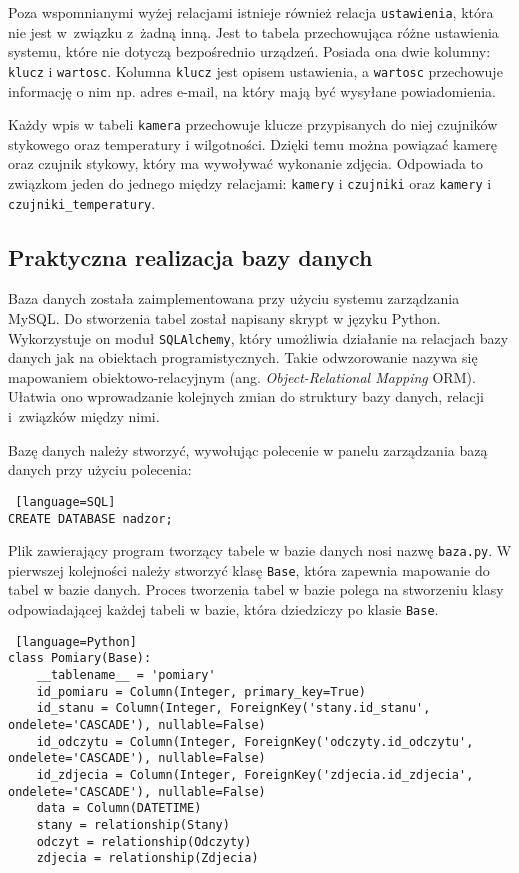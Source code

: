 \documentclass[a4paper,11pt,twoside]{article}
\begin{document}
Poza wspomnianymi wyżej relacjami istnieje również relacja \texttt{ustawienia}, która nie jest w~związku z~żadną inną. Jest to tabela przechowująca różne ustawienia systemu, które nie dotyczą bezpośrednio urządzeń. Posiada ona dwie kolumny: \texttt{klucz} i \texttt{wartosc}. Kolumna \texttt{klucz} jest opisem ustawienia, a \texttt{wartosc} przechowuje informację o nim np. adres e-mail, na który mają być wysyłane powiadomienia. 

Każdy wpis w tabeli \texttt{kamera} przechowuje klucze przypisanych do niej czujników stykowego oraz temperatury i wilgotności. Dzięki temu można powiązać kamerę oraz czujnik stykowy, który ma wywoływać wykonanie zdjęcia. Odpowiada to związkom jeden do jednego między relacjami: \texttt{kamery} i \texttt{czujniki} oraz \texttt{kamery} i \texttt{czujniki{\_}temperatury}.

\subsection{Praktyczna realizacja bazy danych}
Baza danych została zaimplementowana przy użyciu systemu zarządzania MySQL. Do stworzenia tabel został napisany skrypt w języku Python. Wykorzystuje on moduł \texttt{SQLAlchemy}, który umożliwia działanie na relacjach bazy danych jak na obiektach programistycznych. Takie odwzorowanie nazywa się mapowaniem obiektowo-relacyjnym (ang. \textit{Object-Relational Mapping} ORM). Ułatwia ono wprowadzanie kolejnych zmian do struktury bazy danych, relacji i~związków między nimi.

Bazę danych należy stworzyć, wywołując polecenie w panelu zarządzania bazą danych przy użyciu polecenia:
\begin{lstlisting} [language=SQL]
CREATE DATABASE nadzor;
\end{lstlisting}
Plik zawierający program tworzący tabele w bazie danych nosi nazwę \texttt{baza.py}. W pierwszej kolejności należy stworzyć klasę \texttt{Base}, która zapewnia mapowanie do tabel w bazie danych. Proces tworzenia tabel w bazie polega na stworzeniu klasy odpowiadającej każdej tabeli w bazie, która dziedziczy po klasie \texttt{Base}\cite{sqlalchemy-base}.
\begin{lstlisting} [language=Python]
class Pomiary(Base):
    __tablename__ = 'pomiary'
    id_pomiaru = Column(Integer, primary_key=True)
    id_stanu = Column(Integer, ForeignKey('stany.id_stanu', ondelete='CASCADE'), nullable=False)
    id_odczytu = Column(Integer, ForeignKey('odczyty.id_odczytu', ondelete='CASCADE'), nullable=False)
    id_zdjecia = Column(Integer, ForeignKey('zdjecia.id_zdjecia', ondelete='CASCADE'), nullable=False)
    data = Column(DATETIME)
    stany = relationship(Stany)
    odczyt = relationship(Odczyty)
    zdjecia = relationship(Zdjecia)
\end{lstlisting}
\end{document}
